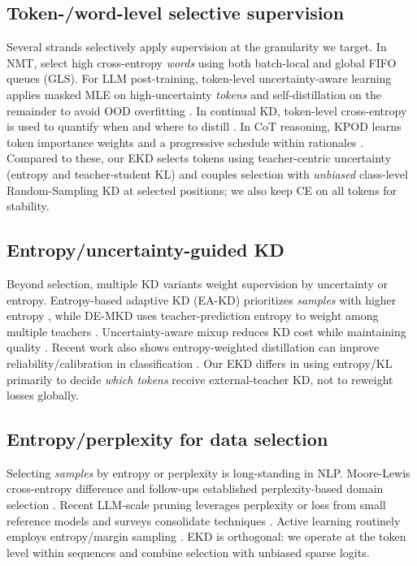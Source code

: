 \documentclass[11pt]{article}
\begin{document}
\subsection{Token-/word-level selective supervision} Several strands selectively apply supervision at the granularity we target. In NMT, \citet{wang2021selectivekd} select high cross-entropy \emph{words} using both batch-local and global FIFO queues (GLS). For LLM post-training, token-level uncertainty-aware learning applies masked MLE on high-uncertainty \emph{tokens} and self-distillation on the remainder to avoid OOD overfitting \citep{liu2025tokenlevel}. In continual KD, token-level cross-entropy is used to quantify when and where to distill \citep{zhang2023continualkd}. In CoT reasoning, KPOD learns token importance weights and a progressive schedule within rationales \citep{feng2024kpod}. Compared to these, our EKD selects tokens using teacher-centric uncertainty (entropy and teacher-student KL) and couples selection with \emph{unbiased} class-level Random-Sampling KD at selected positions; we also keep CE on all tokens for stability.

\subsection{Entropy/uncertainty-guided KD} Beyond selection, multiple KD variants weight supervision by uncertainty or entropy. Entropy-based adaptive KD (EA-KD) prioritizes \emph{samples} with higher entropy \citep{su2023eakd}, while DE-MKD uses teacher-prediction entropy to weight among multiple teachers \citep{cheng2024demkd}. Uncertainty-aware mixup reduces KD cost while maintaining quality \citep{xu2023unix}. Recent work also shows entropy-weighted distillation can improve reliability/calibration in classification \citep{guo2024entropykd}. Our EKD differs in using entropy/KL primarily to decide \emph{which tokens} receive external-teacher KD, not to reweight losses globally.


\subsection{Entropy/perplexity for data selection} Selecting \emph{samples} by entropy or perplexity is long-standing in NLP. Moore-Lewis cross-entropy difference and follow-ups established perplexity-based domain selection \citep{moore2010cediff,axelrod2015few,axelrod2017cynical}. Recent LLM-scale pruning leverages perplexity or loss from small reference models \citep{ankner2024perplexedperplexityperplexitybaseddata} and surveys consolidate techniques \citep{datasel2024survey}. Active learning routinely employs entropy/margin sampling \citep{zhang2022alsurvey}. EKD is orthogonal: we operate at the token level within sequences and combine selection with unbiased sparse logits.
\end{document}

